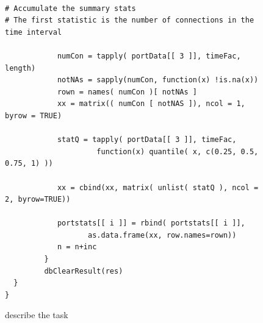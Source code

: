 \begin{figure}
\begin{verbatim}

# Accumulate the summary stats
# The first statistic is the number of connections in the time interval

            numCon = tapply( portData[[ 3 ]], timeFac, length)
            notNAs = sapply(numCon, function(x) !is.na(x))
            rown = names( numCon )[ notNAs ]
            xx = matrix(( numCon [ notNAS ]), ncol = 1, byrow = TRUE)

            statQ = tapply( portData[[ 3 ]], timeFac, 
                     function(x) quantile( x, c(0.25, 0.5, 0.75, 1) ))

            xx = cbind(xx, matrix( unlist( statQ ), ncol = 2, byrow=TRUE))

            portstats[[ i ]] = rbind( portstats[[ i ]], 
                   as.data.frame(xx, row.names=rown))
            n = n+inc
         }
         dbClearResult(res)
  }
}
\end{verbatim}
\caption{describe the task}\label{dbms:fig:TCPbundle}
\end{figure}




